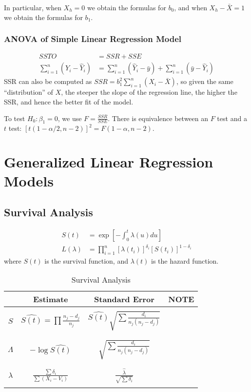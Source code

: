 \documentclass{memoir}
\begin{document}
In particular, when $X_h = 0$ we obtain the formulas for $b_0$, and when $X_h - \bar X = 1$ we obtain the formulas for $b_1$.

\subsection{ANOVA of Simple Linear Regression Model}
\begin{align}
	SSTO &= SSR + SSE\\
	\sum_{i=1}^n (Y_i - \hat Y_i) &= \sum_{i=1}^n (\hat Y_i - \bar y) + \sum_{i=1}^n (\bar y - \hat Y_i)
\end{align}
SSR can also be computed as $SSR = b_1^2 \sum_{i=1}^n (X_i - \bar X)$, so given the same ``distribution'' of $X$, the steeper the slope of the regression line, the higher the SSR, and hence the better fit of the model.

To test $H_0: \beta_1 = 0$, we use $F = \frac{SSR}{SSE}$. There is equivalence between an $F$ test and a $t$ test: $[t(1-\alpha/2,n-2)]^2 = F(1-\alpha,n-2)$.

\chapter{Generalized Linear Regression Models}
\section{Survival Analysis}
\begin{align}
	S(t) &= \exp \left[-\int_0^t \lambda(u) du \right] \\
	L(\lambda) &= \prod_{i=1}^n [\lambda(t_i)]^{\delta_i} [S(t_i)]^{1-\delta_i}
\end{align}
where $S(t)$ is the survival function, and $\lambda(t)$ is the hazard function.

\begin{table}[h]
\centering
\begin{tabular}{c || c c c }
\hline
& {Estimate} & {Standard Error} & {NOTE} \\
\hline
\\
$S$& $\hat{S(t)} = \prod \frac{n_j-d_j}{n_j}$ & $\hat{S(t)} \sqrt{\sum \frac{d_i}{n_j(n_j-d_j)}}$ &\\
\\
\hline
\\
$\Lambda$& $-\log \hat{S(t)}$ & $\sqrt{\sum \frac{d_i}{n_j(n_j-d_j)}}$& \\
\\
\hline
\\
$\lambda$& $\frac{\sum \delta_i}{\sum (X_i-V_i)}$ & $\frac{\hat \lambda}{\sqrt{\sum \delta_i}}$\\
\\
\hline
\end{tabular}
\caption{Survival Analysis}
\end{table}
\end{document}
